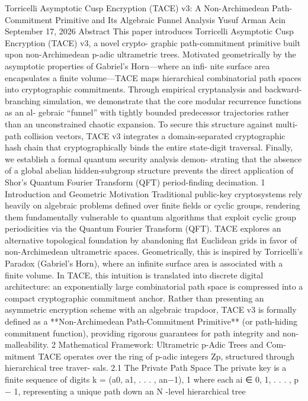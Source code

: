 Torricelli Asymptotic Cusp Encryption (TACE) v3:
A Non-Archimedean Path-Commitment Primitive
and Its Algebraic Funnel Analysis
Yusuf Arman Acin
September 17, 2026
Abstract
This paper introduces Torricelli Asymptotic Cusp Encryption (TACE) v3, a novel crypto-
graphic path-commitment primitive built upon non-Archimedean p-adic ultrametric trees.
Motivated geometrically by the asymptotic properties of Gabriel’s Horn—where an infi-
nite surface area encapsulates a finite volume—TACE maps hierarchical combinatorial path
spaces into cryptographic commitments. Through empirical cryptanalysis and backward-
branching simulation, we demonstrate that the core modular recurrence functions as an al-
gebraic “funnel” with tightly bounded predecessor trajectories rather than an unconstrained
chaotic expansion. To secure this structure against multi-path collision vectors, TACE v3
integrates a domain-separated cryptographic hash chain that cryptographically binds the
entire state-digit traversal. Finally, we establish a formal quantum security analysis demon-
strating that the absence of a global abelian hidden-subgroup structure prevents the direct
application of Shor’s Quantum Fourier Transform (QFT) period-finding decimation.
1 Introduction and Geometric Motivation
Traditional public-key cryptosystems rely heavily on algebraic problems defined over finite fields
or cyclic groups, rendering them fundamentally vulnerable to quantum algorithms that exploit
cyclic group periodicities via the Quantum Fourier Transform (QFT).
TACE explores an alternative topological foundation by abandoning flat Euclidean grids
in favor of non-Archimedean ultrametric spaces. Geometrically, this is inspired by Torricelli’s
Paradox (Gabriel’s Horn), where an infinite surface area is associated with a finite volume.
In TACE, this intuition is translated into discrete digital architecture: an exponentially large
combinatorial path space is compressed into a compact cryptographic commitment anchor.
Rather than presenting an asymmetric encryption scheme with an algebraic trapdoor, TACE
v3 is formally defined as a **Non-Archimedean Path-Commitment Primitive** (or path-hiding
commitment function), providing rigorous guarantees for path integrity and non-malleability.
2 Mathematical Framework: Ultrametric p-Adic Trees and Com-
mitment
TACE operates over the ring of p-adic integers Zp, structured through hierarchical tree traver-
sals.
2.1 The Private Path Space
The private key is a finite sequence of digits
k = (a0, a1, . . . , an−1),
1
where each ai ∈ {0, 1, . . . , p − 1}, representing a unique path down an N -level hierarchical tree
